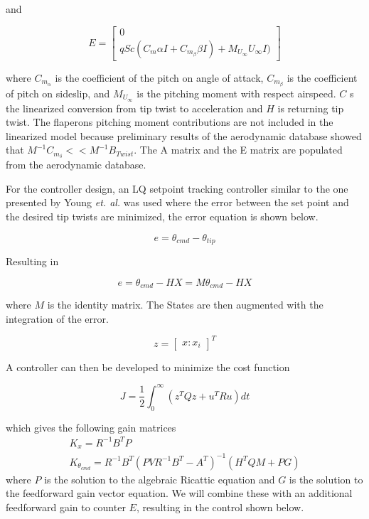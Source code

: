 \documentclass[11pt]{ucthesis}
\begin{document}
and

\begin{equation}
E = \begin{bmatrix}
0\\
qSc(C_m\alpha I+C_{m_{\beta}}\beta I)+M_{U_{\infty}}U_{\infty}I)
\end{bmatrix}
\end{equation}

where $C_{m_{\alpha}}$ is the coefficient of the pitch on angle of attack, $C_{m_{\beta}}$ is the coefficient of pitch on sideslip, and $M_{U_{\infty}}$ is the pitching moment with respect airspeed. $C$ s the linearized conversion from tip twist to acceleration and $H$ is returning tip twist. The flaperons pitching moment contributions are not included in the linearized model because preliminary results of the aerodynamic database showed that $M^{-1}C_{m_{\delta}}<<M^{-1}B_{Twist}$. The A matrix and the E matrix are populated from the aerodynamic database.

For the controller design, an LQ setpoint tracking controller similar to the one presented by Young \textit{et. al.}\cite{young1972approach}  was used where the error between the set point and the desired tip twists are minimized, the error equation is shown below.

\begin{equation}
e = \theta_{cmd}-\theta_{tip}
\end{equation}

Resulting in

\begin{equation}
e = \theta_{cmd}-HX = M\theta_{cmd}-HX
\end{equation}

where $M$ is the identity matrix. The States are then augmented with the integration of the error.

\begin{equation}
z = \begin{bmatrix}
x:x_i\end{bmatrix}^T
\end{equation}

A controller can then be developed to minimize the cost function

\begin{equation}
J=\frac{1}{2}\int^{\infty}_0 (z^TQz+u^TRu)dt
\end{equation}

which gives the following gain matrices
\begin{equation}
\begin{matrix}
K_x = R^{-1}B^TP\\
K_{\theta_{cmd}} = R^{-1}B^T(PVR^{-1}B^T-A^T)^{-1}(H^TQM+PG)
\end{matrix}
\end{equation}
where $P$ is the solution to the algebraic Ricattic equation and $G$ is the solution to the feedforward gain vector equation. We will combine these with an additional feedforward gain to counter $E$, resulting in the control shown below.
\end{document}
